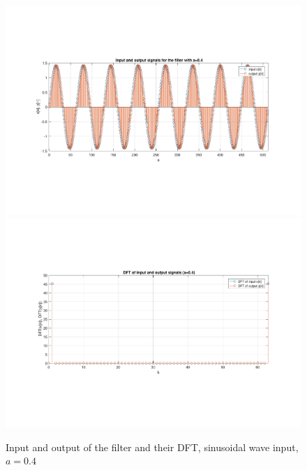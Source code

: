 \begin{figure} [H]
	\centering
	\includegraphics[trim={2.5cm 5cm 2.5cm 5cm}, clip, width=0.75\linewidth]{io_sin_5}
	\includegraphics[trim={2.5cm 5cm 2.5cm 5cm}, clip, width=0.75\linewidth]{dft_sin_5}
		\caption{Input and output of the filter and their DFT, sinusoidal wave input, $a=0.4$}
	\label{fig:t1_io_sin_5}
\end{figure}
